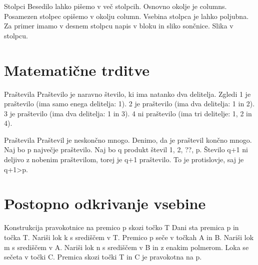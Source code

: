 \documentclass{beamer}
\begin{document}
   Stolpci
            Besedilo lahko pišemo v več stolpcih.
            Osnovno okolje je columns.
            Posamezen stolpec opišemo v okolju column.
            Vsebina stolpca je lahko poljubna.
            Za primer imamo v desnem stolpcu napis v bloku in sliko sončnice.
            Slika v stolpcu.


\section {Matematične trditve}


   Praštevila
      Praštevilo je naravno število, ki ima natanko dva delitelja.
   Zgledi
         1 je praštevilo (ima samo enega delitelja: 1).
         2 je praštevilo (ima dva delitelja: 1 in 2).
         3 je praštevilo (ima dva delitelja: 1 in 3).
         4 ni praštevilo (ima tri delitelje: 1, 2 in 4).


   Praštevila
      Praštevil je neskončno mnogo.
      Denimo, da je praštevil končno mnogo.
         Naj bo p največje praštevilo.
         Naj bo q produkt števil 1, 2, ??, p.
         Število q+1 ni deljivo z nobenim praštevilom, torej je q+1 praštevilo.
         To je protislovje, saj je q+1>p.


\section {Postopno odkrivanje vsebine}


   Konstrukcija pravokotnice na premico p skozi točko T
            Dani sta premica p in točka T.
            Nariši lok k s središčem v T.
            Premico p seče v točkah A in B.
            Nariši lok m s središčem v A.
            Nariši lok n s središčem v B in z enakim polmerom.
            Loka se sečeta v točki C.
            Premica skozi točki T in C je pravokotna na p.

\end{document}
